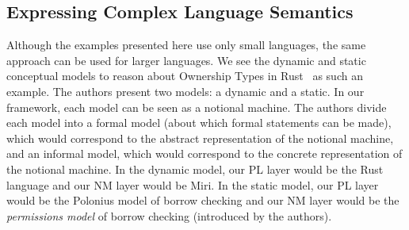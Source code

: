 %

\subsection{Expressing Complex Language Semantics}
\label{sec:more-complexity}

Although the examples presented here use only small languages,
the same approach can be used for larger languages.
We see
the dynamic and static conceptual models
to reason about Ownership Types in Rust~\citep{crichtonGroundedConceptualModel2023}
as such an example.
The authors present two models: a dynamic and a static.
In our framework,
each model can be seen as a notional machine.
The authors divide each model into a formal model (about which formal statements can be made), which would correspond to the abstract representation of the notional machine,
and an informal model, which would correspond to the concrete representation of the notional machine.
%
In the dynamic model,
our PL layer would be the Rust language
and
our NM layer would be Miri.
%
In the static model,
our PL layer would be the Polonius model of borrow checking
and
our NM layer would be the \emph{permissions model} of borrow checking
(introduced by the authors).

